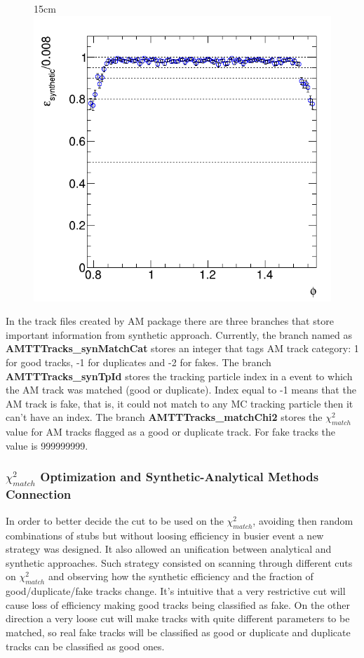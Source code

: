 \begin{figure}[htbp]{15cm}
	\includegraphics[scale=0.23]{AppendixCMSL1TT/figs/single_muon_nopu_tcat/am_tracks_reco_eff_vs_phi_allogics_nodupremoval}
	\label{fig:track_cat_eff_muon_no_pu}
\end{figure}

In the track files created by AM package there are three branches that store important information from synthetic approach. Currently, the branch named as \textbf{AMTTTracks\_synMatchCat} stores an integer that tags AM track category: 1 for good tracks, -1 for duplicates and -2 for fakes. The branch \textbf{AMTTTracks\_synTpId} stores the tracking particle index in a event to which the AM track was matched (good or duplicate). Index equal to -1 means that the AM track is fake, that is, it could not match to any MC tracking particle then it can't have an index. The branch \textbf{AMTTTracks\_matchChi2} stores the $\chi^{2}_{match}$ value for AM tracks flagged as a good or duplicate track. For fake tracks the value is 999999999.

\subsubsection{$\chi^{2}_{match}$ Optimization and Synthetic-Analytical Methods Connection}
In order to better decide the cut to be used on the $\chi^{2}_{match}$, avoiding then random combinations of stubs but without loosing efficiency in busier event a new strategy was designed. It also allowed an unification between analytical and synthetic approaches. Such strategy consisted on scanning through different cuts on $\chi^{2}_{match}$ and observing how the synthetic efficiency and the fraction of good/duplicate/fake tracks change. It's intuitive that a very restrictive cut will cause loss of efficiency making good tracks being classified as fake. On the other direction a very loose cut will make tracks with quite different parameters to be matched, so real fake tracks will be classified as good or duplicate and duplicate tracks can be classified as good ones. 

